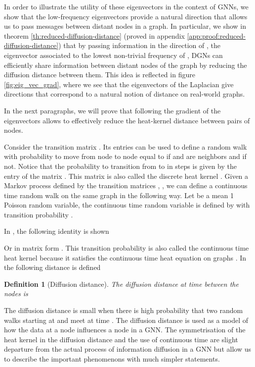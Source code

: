 \documentclass{article} \usepackage{arxiv,times}
\newtheorem{definition}{Definition}
\begin{document}
In order to illustrate the utility of these eigenvectors in the context of GNNs, we show that the low-frequency eigenvectors provide a natural direction that allows us to pass messages between distant nodes in a graph. 
In particular, we show in theorem \ref{th:reduced-diffusion-distance} (proved in appendix \ref{app:proof:reduced-diffusion-distance}) that by passing information in the direction of , the eigenvector associated to the lowest non-trivial frequency of , DGNs can efficiently share information between distant nodes of the graph by reducing the diffusion distance between them. This idea is reflected in figure \ref{fig:eig_vec_grad}, where we see that the eigenvectors of the Laplacian give directions that correspond to a natural notion of distance on real-world graphs. 





In the next paragraphs, we will prove that following the gradient of the eigenvectors allows to effectively reduce the heat-kernel distance between pairs of nodes.



Consider the transition matrix . Its entries can be used to define a random walk with probability to move from node  to node  equal to  if  and  are neighbors and  if not. Notice that the probability to transition from  to  in  steps is given by the  entry of the matrix . This matrix is also called the discrete heat kernel . 
Given a Markov process  defined by the transition matrices , , we can define a continuous time random walk on the same graph in the following way. Let  be a mean 1 Poisson random variable, the continuous time random variable is defined by  with transition probability .

In \cite{barlow_2017}, the following identity is shown 

Or in matrix form . This transition probability is also called the continuous time heat kernel because it satisfies the continuous time heat equation on graphs . In \cite{COIFMAN20065} the following distance is defined
\begin{definition}[Diffusion distance]
The diffusion distance at time  between the nodes  is 

\end{definition}
The diffusion distance is small when there is high probability that two random walks starting at  and  meet at time . The diffusion distance is used as a model of how the data at a node  influences a node  in a GNN. The symmetrisation of the heat kernel in the diffusion distance and the use of continuous time are slight departure from the actual process of information diffusion in a GNN but allow us to describe the important phenomenons with much simpler statements.
\end{document}
